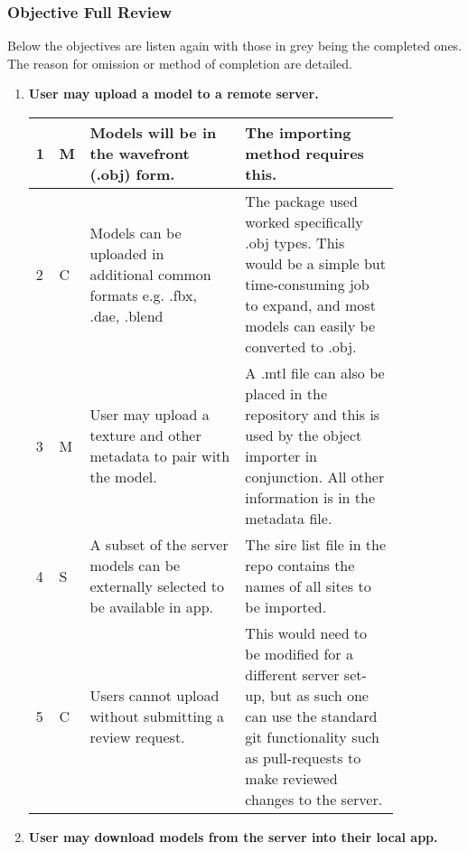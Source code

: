 \documentclass[12pt, a4paper]{article}
\newcommand{\light}[1]{\textcolor{mygrey}{#1}}
\begin{document}
\subsubsection{Objective Full Review}
Below the objectives are listen again with those in \light{grey} being the completed ones. The reason for omission or method of completion are detailed.

\begin{enumerate}[label=\Roman*.]
\item \textbf{User may upload a model to a remote server.}
\begin{table}[H]
\begin{tabular}{| p{0.02\linewidth} | p{0.02\linewidth} | p{0.4\linewidth} | p{0.4\linewidth} | }
\hline
1 & M & \light{Models will be in the wavefront (.obj) form. }            & The importing method requires this. \\ \hline
2 & C & Models can be uploaded in additional common formats e.g. .fbx, .dae, .blend & The package used worked specifically .obj types. This would be a simple but time-consuming job to expand, and most models can easily be converted to .obj. \\ \hline
3 & M & \light{User may upload a texture and other metadata to pair with the model.} & A .mtl file can also be placed in the repository and this is used by the object importer in conjunction. All other information is in the metadata file. \\ \hline
4 & S & \light{A subset of the server models can be externally selected to be available in app.} & The sire list file in the repo contains the names of all sites to be imported. \\ \hline
5 & C & \light{Users cannot upload without submitting a review request.} & This would need to be modified for a different server set-up, but as such one can use the standard git functionality such as pull-requests to make reviewed changes to the server. \\ \hline
\end{tabular}
\end{table}
    
\item \textbf{User may download models from the server into their local app.}


\end{enumerate}
\end{document}
